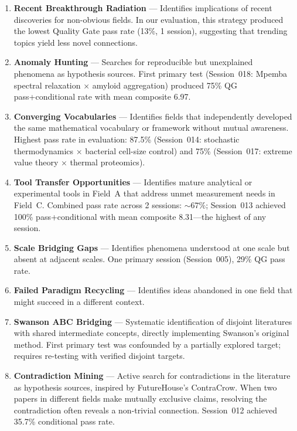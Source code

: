 \begin{enumerate}
    \item \textbf{Recent Breakthrough Radiation} --- Identifies implications of recent discoveries for non-obvious fields. In our evaluation, this strategy produced the lowest Quality Gate pass rate (13\%, 1 session), suggesting that trending topics yield less novel connections.

    \item \textbf{Anomaly Hunting} --- Searches for reproducible but unexplained phenomena as hypothesis sources. First primary test (Session~018: Mpemba spectral relaxation $\times$ amyloid aggregation) produced 75\% QG pass+conditional rate with mean composite 6.97.

    \item \textbf{Converging Vocabularies} --- Identifies fields that independently developed the same mathematical vocabulary or framework without mutual awareness. Highest pass rate in evaluation: 87.5\% (Session~014: stochastic thermodynamics $\times$ bacterial cell-size control) and 75\% (Session~017: extreme value theory $\times$ thermal proteomics).

    \item \textbf{Tool Transfer Opportunities} --- Identifies mature analytical or experimental tools in Field~A that address unmet measurement needs in Field~C. Combined pass rate across 2 sessions: ${\sim}67\%$; Session~013 achieved 100\% pass+conditional with mean composite 8.31---the highest of any session.

    \item \textbf{Scale Bridging Gaps} --- Identifies phenomena understood at one scale but absent at adjacent scales. One primary session (Session~005), 29\% QG pass rate.

    \item \textbf{Failed Paradigm Recycling} --- Identifies ideas abandoned in one field that might succeed in a different context.

    \item \textbf{Swanson ABC Bridging} --- Systematic identification of disjoint literatures with shared intermediate concepts, directly implementing Swanson's original method. First primary test was confounded by a partially explored target; requires re-testing with verified disjoint targets.

    \item \textbf{Contradiction Mining} --- Active search for contradictions in the literature as hypothesis sources, inspired by FutureHouse's ContraCrow. When two papers in different fields make mutually exclusive claims, resolving the contradiction often reveals a non-trivial connection. Session~012 achieved 35.7\% conditional pass rate.


\end{enumerate}
